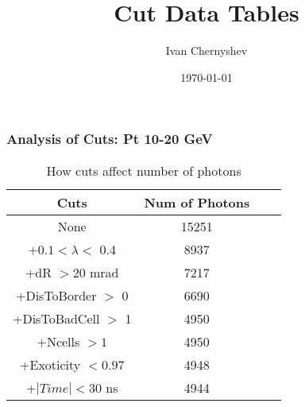 \documentclass{beamer}
\title{Cut Data Tables}
\author{Ivan Chernyshev}
\date{\today}
\begin{document}
 

\frame 
{ 
\frametitle{Analysis of Cuts: Pt 10-20 GeV} 
\begin{table} 
\caption{How cuts affect number of photons} 
\centering 
\begin{tabular}{c c c c} 
\hline\hline 
Cuts & Num of Photons\\ [0.5ex] 
\hline
None & 15251\\
+$0.1 < \lambda <$ 0.4 & 8937\\
+dR $> 20$ mrad & 7217\\
+DisToBorder $>$ 0 & 6690\\
+DisToBadCell $>$ 1 & 4950\\
+Ncells $> 1$ & 4950\\
+Exoticity $< 0.97$ & 4948\\
+$|Time| < 30$ ns & 4944\\
[1ex] 
\hline 
\end{tabular} 
\label{table:nonlin} 
\end{table} 
} 
\end{document}
